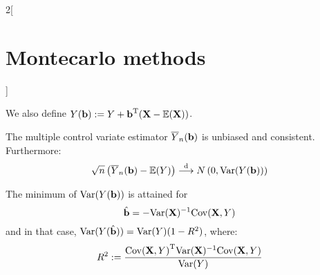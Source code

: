 \documentclass[../../../main_math.tex]{subfiles}
\begin{document}
\begin{multicols}{2}[\section{Montecarlo methods}]
\begin{definition}
    We also define $Y(\boldsymbol{\mathrm{b}}):= Y+{\boldsymbol{\mathrm{b}}}^{\mathrm{T}}(\boldsymbol{\mathrm{X}}-\mathbb{E}(\boldsymbol{\mathrm{X}}))$.
  \end{definition}
  \begin{lemma}
    The multiple control variate estimator $\overline{Y}_n(\boldsymbol{\mathrm{b}})$ is unbiased and consistent. Furthermore:
    $$
      \sqrt{n}\left(\overline{Y}_n(\boldsymbol{\mathrm{b}})-\mathbb{E}(Y)\right)\overset{\text{d}}{\longrightarrow}N\left(0,\mathrm{Var}(Y(\boldsymbol{\mathrm{b}}))\right)
    $$
  \end{lemma}
  \begin{proposition}
    The minimum of $\mathrm{Var}(Y(\boldsymbol{\mathrm{b}}))$ is attained for $$\hat{\boldsymbol{\mathrm{b}}}=
      -\mathrm{Var}(\boldsymbol{\mathrm{X}})^{-1}\mathrm{Cov}(\boldsymbol{\mathrm{X}},Y)
    $$
    and in that case, $\mathrm{Var}(Y(\hat{\boldsymbol{\mathrm{b}}}))=\mathrm{Var}(Y)(1-R^2)$, where:
    $$
      R^2:=\frac{{\mathrm{Cov}(\boldsymbol{\mathrm{X}},Y)}^{\mathrm{T}}\mathrm{Var}(\boldsymbol{\mathrm{X}})^{-1}\mathrm{Cov}(\boldsymbol{\mathrm{X}},Y)}{\mathrm{Var}(Y)}
    $$
  \end{proposition}

\end{multicols}
\end{document}
